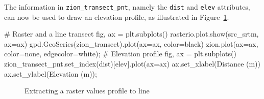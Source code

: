 \documentclass[
  letterpaper,
]{krantz}
\newenvironment{Shaded}{\begin{snugshade}}{\end{snugshade}}
\newcommand{\CommentTok}[1]{\textcolor[rgb]{0.37,0.37,0.37}{#1}}
\newcommand{\NormalTok}[1]{\textcolor[rgb]{0.00,0.23,0.31}{#1}}
\newcommand{\OperatorTok}[1]{\textcolor[rgb]{0.37,0.37,0.37}{#1}}
\newcommand{\StringTok}[1]{\textcolor[rgb]{0.13,0.47,0.30}{#1}}
\begin{document}
The information in \texttt{zion\_transect\_pnt}, namely the
\texttt{\textquotesingle{}dist\textquotesingle{}} and
\texttt{\textquotesingle{}elev\textquotesingle{}} attributes, can now be
used to draw an elevation profile, as illustrated in
Figure~\ref{fig-zion-transect}.

\begin{Shaded}
\begin{Highlighting}[]
\CommentTok{\# Raster and a line transect}
\NormalTok{fig, ax }\OperatorTok{=}\NormalTok{ plt.subplots()}
\NormalTok{rasterio.plot.show(src\_srtm, ax}\OperatorTok{=}\NormalTok{ax)}
\NormalTok{gpd.GeoSeries(zion\_transect).plot(ax}\OperatorTok{=}\NormalTok{ax, color}\OperatorTok{=}\StringTok{\textquotesingle{}black\textquotesingle{}}\NormalTok{)}
\NormalTok{zion.plot(ax}\OperatorTok{=}\NormalTok{ax, color}\OperatorTok{=}\StringTok{\textquotesingle{}none\textquotesingle{}}\NormalTok{, edgecolor}\OperatorTok{=}\StringTok{\textquotesingle{}white\textquotesingle{}}\NormalTok{)}\OperatorTok{;}
\CommentTok{\# Elevation profile}
\NormalTok{fig, ax }\OperatorTok{=}\NormalTok{ plt.subplots()}
\NormalTok{zion\_transect\_pnt.set\_index(}\StringTok{\textquotesingle{}dist\textquotesingle{}}\NormalTok{)[}\StringTok{\textquotesingle{}elev\textquotesingle{}}\NormalTok{].plot(ax}\OperatorTok{=}\NormalTok{ax)}
\NormalTok{ax.set\_xlabel(}\StringTok{\textquotesingle{}Distance (m)\textquotesingle{}}\NormalTok{)}
\NormalTok{ax.set\_ylabel(}\StringTok{\textquotesingle{}Elevation (m)\textquotesingle{}}\NormalTok{)}\OperatorTok{;}
\end{Highlighting}
\end{Shaded}

\begin{figure}

\begin{minipage}{0.50\linewidth}



\end{minipage}%
%
\begin{minipage}{0.50\linewidth}



\end{minipage}%

\caption{\label{fig-zion-transect}Extracting a raster values profile to
line}

\end{figure}%
\end{document}

